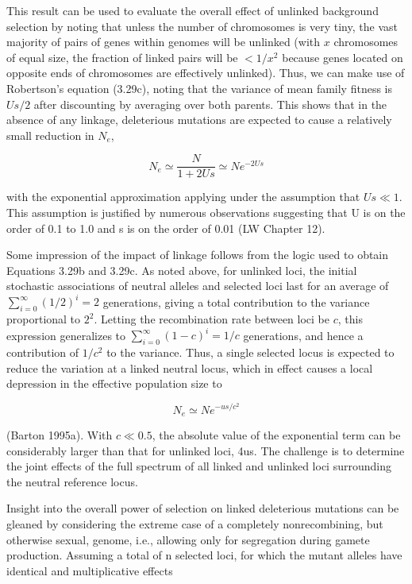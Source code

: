 \documentclass{article}
\begin{document}
This result can be used to evaluate the overall effect of unlinked background selection by noting that unless the number of chromosomes is very tiny, the vast majority of pairs of genes within genomes will be unlinked (with $x$ chromosomes of equal size, the fraction of linked pairs will be $< 1/x^{2}$ because genes located on opposite ends of chromosomes are effectively unlinked). Thus, we can make use of Robertson's equation (3.29c), noting that the variance of mean family fitness is $Us/2$ after discounting by averaging over both parents. This shows that in the absence of any linkage, deleterious mutations are expected to cause a relatively small reduction in $N_{e}$,

\begin{equation}
N_{e}\simeq\frac{N}{1+2U s}\simeq N e^{-2U s}
\tag{3.32}
\label{eq:3_32}
\end{equation}

with the exponential approximation applying under the assumption that  $ U s \ll 1 $. This assumption is justified by numerous observations suggesting that U is on the order of 0.1 to 1.0 and s is on the order of 0.01 (LW Chapter 12).

Some impression of the impact of linkage follows from the logic used to obtain Equations 3.29b and 3.29c. As noted above, for unlinked loci, the initial stochastic associations of neutral alleles and selected loci last for an average of  $ \sum_{i=0}^{\infty}(1/2)^{i}=2 $ generations, giving a total contribution to the variance proportional to  $ 2^{2} $. Letting the recombination rate between loci be  $ c $, this expression generalizes to  $ \sum_{i=0}^{\infty}(1-c)^{i}=1/c $ generations, and hence a contribution of  $ 1/c^{2} $ to the variance. Thus, a single selected locus is expected to reduce the variation at a linked neutral locus, which in effect causes a local depression in the effective population size to

\begin{equation}
N_{e}\simeq N e^{-u s/c^{2}}
\tag{3.33}
\label{eq:3_33}
\end{equation}

(Barton 1995a). With  $ c \ll 0.5 $, the absolute value of the exponential term can be considerably larger than that for unlinked loci, 4us. The challenge is to determine the joint effects of the full spectrum of all linked and unlinked loci surrounding the neutral reference locus.

Insight into the overall power of selection on linked deleterious mutations can be gleaned by considering the extreme case of a completely nonrecombining, but otherwise sexual, genome, i.e., allowing only for segregation during gamete production. Assuming a total of n selected loci, for which the mutant alleles have identical and multiplicative effects
\end{document}
